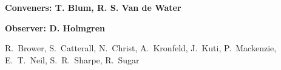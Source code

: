 

\begin{center}

\begin{large} {\bf Conveners: T. Blum, R. S. Van de Water} \end{large}
\begin{large} {\bf Observer: D. Holmgren} \end{large}

R.~Brower,
S.~Catterall,
N.~Christ,
A.~Kronfeld,
J.~Kuti,
P.~Mackenzie,
E.~T.~Neil,
S.~R.~Sharpe,
R.~Sugar

\end{center}

